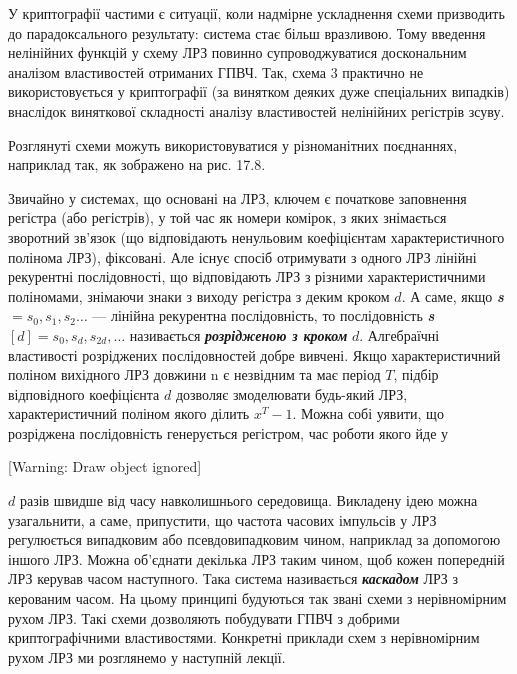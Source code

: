 \bigskip


\bigskip

{\par}


\bigskip

 У криптографії частими є ситуації, коли надмірне ускладнення схеми призводить
до парадоксального результату: система стає більш вразливою. Тому введення
нелінійних функцій у схему ЛРЗ повинно супроводжуватися доскональним аналізом
властивостей отриманих ГПВЧ.  Так, схема 3 практично не використовується у
криптографії (за винятком деяких дуже спеціальних випадків)  внаслідок
виняткової складності  аналізу властивостей нелінійних регістрів зсуву.

Розглянуті схеми можуть використовуватися у різноманітних поєднаннях, наприклад
так, як зображено на рис. 17.8. 

Звичайно у системах, що основані на ЛРЗ, ключем є початкове заповнення регістра
(або регістрів), у той час як номери комірок, з яких знімається зворотний
зв’язок (що відповідають ненульовим коефіцієнтам характеристичного полінома
ЛРЗ), фіксовані. Але існує спосіб отримувати з одного ЛРЗ лінійні рекурентні
послідовності, що відповідають ЛРЗ з різними характеристичними поліномами,
знімаючи знаки з виходу регістра з деким кроком  ${d}$. А саме, якщо
\textbf{\textit{s}} ${=s_{{0}},s_{{1}},s_{{2}}\dots}$ ---
лінійна рекурентна послідовність, то послідовність \textbf{\textit{s}}
${[d]=s_{{0}},s_{{d}},s_{{2d}},\dots}$ називається
\textbf{\textit{розрідженою з кроком}}\textbf{ } ${d}$. Алгебраїчні властивості
розріджених послідовностей добре вивчені. Якщо характеристичний поліном
вихідного ЛРЗ довжини n є незвідним та має період  ${T}$, підбір відповідного
коефіцієнта  ${d}$ дозволяє змоделювати будь-який ЛРЗ, характеристичний поліном
якого ділить  ${x^{{T}}-1}$. Можна собі уявити, що розріджена послідовність
генерується регістром, час роботи якого йде у

[Warning: Draw object ignored] 

 ${d}$ разів швидше від часу навколишнього середовища. Викладену ідею можна
узагальнити, а саме, припустити, що частота часових імпульсів у ЛРЗ регулюється
випадковим або псевдовипадковим чином, наприклад за допомогою іншого ЛРЗ. Можна
об’єднати декілька ЛРЗ таким чином, щоб кожен попередній ЛРЗ керував часом
наступного. Така система називається \textbf{\textit{каскадом}}\textit{ }ЛРЗ з
керованим часом. На цьому принципі будуються так звані схеми з нерівномірним
рухом ЛРЗ. Такі схеми дозволяють побудувати ГПВЧ з добрими криптографічними
властивостями. Конкретні приклади схем з нерівномірним рухом ЛРЗ ми розглянемо
у наступній лекції.


